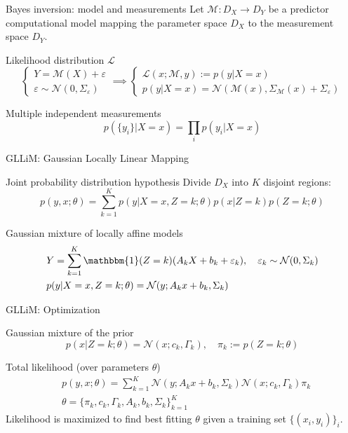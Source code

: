 \begin{frame}{Bayes inversion: model and measurements}
	Let $\mathcal{M} : D_X \rightarrow D_Y$ be a predictor computational model mapping the parameter space $D_X$ to the measurement space $D_Y$.
	\begin{block}{Likelihood distribution $\mathcal{L}$}
	\[
	\begin{cases}
	Y = \mathcal{M}(X) + \varepsilon \\
	\varepsilon \sim \mathcal{N}(0, \Sigma_{\varepsilon})
	\end{cases}
	\implies 
	\begin{cases}
	\mathcal{L}(x;\mathcal{M}, y) := p(y|X=x) \\
	p(y|X=x) = \mathcal{N}(\mathcal{M}(x), \Sigma_{\mathcal{M}}(x) + \Sigma_{\varepsilon})
	\end{cases}
	\]
	\end{block}
	
	\begin{block}{Multiple independent measurements}
	\[p(\{y_i\}| X=x) = \prod_i p(y_i | X = x) \]
	\end{block}
	\end{frame}

\begin{frame}{GLLiM: Gaussian Locally Linear Mapping}
	\begin{block}{Joint probability distribution hypothesis}
	Divide $D_X$ into $K$ disjoint regions:
	\[ p(y,x; \theta) = \sum_{k=1}^K p(y|X=x, Z = k; \theta) p( x| Z = k) p(Z = k; \theta)\]
	\end{block}
	\begin{block}{Gaussian mixture of locally affine models}
	\begin{align*} 
	&Y = \sum_{k=1}^K \mathbbm{1}(Z = k) (A_k X + b_k + \varepsilon_k), \quad \varepsilon_k \sim \mathcal{N}(0, \Sigma_k) \\
	&p(y|X=x, Z=k;\theta) = \mathcal{N}(y; A_k x + b_k, \Sigma_k)
	\end{align*}
	\end{block}
	\end{frame}
	
	\begin{frame}{GLLiM: Optimization}
	\begin{block}{Gaussian mixture of the prior}
	\[p(x|Z=k;\theta) = \mathcal{N}(x;c_k, \Gamma_k), \quad \pi_k := p(Z=k; \theta) \]
	\end{block}
	\begin{block}{Total likelihood (over parameters $\theta$)}
	\begin{align*}
	&p(y,x; \theta) = \sum_{k=1}^K \mathcal{N}(y; A_k x + b_k, \Sigma_k)  \mathcal{N}(x;c_k, \Gamma_k) \pi_k \\
	&\theta = \{\pi_k, c_k, \Gamma_k, A_k, b_k, \Sigma_k \}_{k=1}^K
	\end{align*}
	\alert{Likelihood is maximized to find best fitting $\theta$ given a training set $\{(x_i, y_i)\}_i$.}
	\end{block}
	\end{frame}
	
